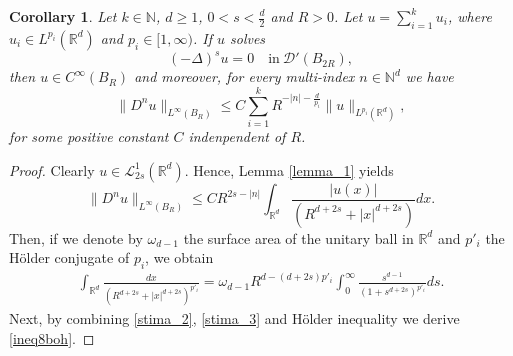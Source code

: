 \documentclass[10pt,a4paper]{amsart}
\newtheorem{corollary}{Corollary}
\newcommand{\N}{{\mathbb N}}
\newcommand{\R}{{\mathbb R}}
\begin{document}
	\begin{corollary}\label{l_p}
		Let $k\in \N$, $d\ge 1$, $0<s<\frac{d}{2}$ and $R>0$. Let $u=\sum^{k}_{i=1} u_i$, where $u_i\in L^{p_i}(\R^d)$ and $p_i\in [1,\infty)$. If $u$ solves 
		\begin{equation*}\label{eq_0}
			(-\Delta)^{s}u=0\quad \text{in}\ \mathscr{D}'(B_{2R}),
		\end{equation*}
		then $u\in C^{\infty}({B_R})$ and moreover, for every multi-index $n\in \N^{d}$ we have
		\begin{equation}\label{ineq8boh}
			\|D^{n}u\|_{L^{\infty}({B_R})}\le C\sum^{k}_{i=1}R^{-|n|-\frac{d}{p_i}}\|u\|_{L^{p_i}(\R^d)},
		\end{equation}
		for some positive constant $C$ indenpendent of $R$.
	\end{corollary}

	\begin{proof}
		Clearly $u\in \mathscr{L}^{1}_{2s}(\R^d)$. Hence, Lemma \ref{lemma_1} yields
		\begin{equation}\label{stima_2}
			\|D^{n}u\|_{L^{\infty}(B_R)}\le CR^{2s-|n|}\int_{\R^d}\frac{|u(x)|}{(R^{d+2s}+|x|^{d+2s})}dx.
		\end{equation}
		Then, if we denote by $\omega_{d-1}$ the surface area of the unitary ball in $\R^d$ and $p'_i$ the H\"older conjugate of $p_i$, we obtain 
		\begin{equation}\label{stima_3}
			\begin{split}
				\int_{\R^d}\frac{dx}{(R^{d+2s}+|x|^{d+2s})^{p'_i}} =\omega_{d-1} R^{d-(d+2s)p'_i}\int_{0}^{\infty}\frac{s^{d-1}}{{(1+s^{d+2s})}^{p'_i}}ds.
			\end{split}
		\end{equation}
		Next, by combining \eqref{stima_2}, \eqref{stima_3} and H\"older inequality we derive \eqref{ineq8boh}.
	\end{proof}
\end{document}
